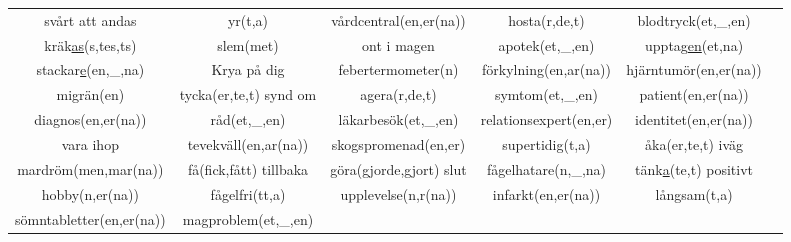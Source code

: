 \begin{center}
\begin{adjustwidth}{-2.4cm}{}
\begin{tabular}{|c c c c c c|}
            svårt att andas & yr(t,a) & vårdcentral(en,er(na)) & hosta(r,de,t) & blodtryck(et,\_,en) &  \\
            kräk\underline{as}(s,tes,ts) & slem(met) & ont i magen & apotek(et,\_,en) & upptag\underline{en}(et,na) &  \\
            stackar\underline{e}(en,\_,na) & Krya på dig & febertermometer(n) & förkylning(en,ar(na)) & hjärntumör(en,er(na)) &  \\
            migrän(en) & tycka(er,te,t) synd om & agera(r,de,t) & symtom(et,\_,en) & patient(en,er(na)) &  \\
            diagnos(en,er(na)) & råd(et,\_,en) & läkarbesök(et,\_,en) & relationsexpert(en,er) & identitet(en,er(na)) &  \\
            vara ihop & tevekväll(en,ar(na)) & skogspromenad(en,er) & supertidig(t,a) & åka(er,te,t) iväg &  \\
            mardröm(men,mar(na)) & få(fick,fått) tillbaka & göra(gjorde,gjort) slut & fågelhatare(n,\_,na) & tänk\underline{a}(te,t) positivt &  \\
            hobby(n,er(na)) & fågelfri(tt,a) & upplevelse(n,r(na)) & infarkt(en,er(na)) & långsam(t,a) &  \\
            sömntabletter(en,er(na)) & magproblem(et,\_,en) &  &  &  &  \\
            \hline
        \end{tabular}
    \end{adjustwidth}
\end{center}


